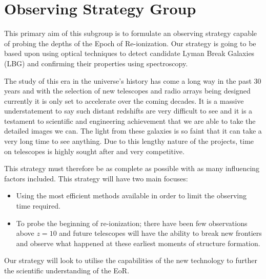 \section{Observing Strategy Group} %
\label{sec:observing_strategy_group}
	This primary aim of this subgroup is to formulate an observing strategy capable of probing the depths of the Epoch of Re-ionization. Our strategy is going to be based upon using optical techniques to detect candidate Lyman Break Galaxies (LBG) and confirming their properties using spectroscopy.

	The study of this era in the universe’s history has come a long way in the past 30 years and with the selection of new telescopes and radio arrays being designed currently it is only set to accelerate over the coming decades. It is a massive understatement to say such distant redshifts are very difficult to see and it is a testament to scientific and engineering achievement that we are able to take the detailed images we can. The light from these galaxies is so faint that it can take a very long time to see anything. Due to this lengthy nature of the projects, time on telescopes is highly sought after and very competitive.

	This strategy must therefore be as complete as possible with as many influencing factors included. This strategy will have two main focuses:
	\begin{itemize}
		\item Using the most efficient methods available in order to limit the observing time required.
		\item To probe the beginning of re-ionization; there have been few observations above $z=10$ and future telescopes will have the ability to break new frontiers and observe what happened at these earliest moments of structure formation.
	\end{itemize}

	Our strategy will look to utilise the capabilities of the new technology to further the scientific understanding of the EoR.

